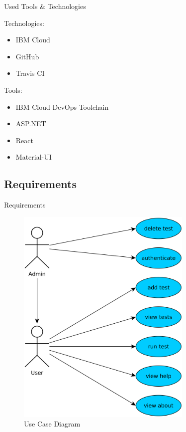 \documentclass[]{beamer}
\begin{document}
    \begin{frame}{Used Tools \& Technologies}
      \setlength{\columnsep}{-40mm}
      \begin{adjustwidth}{12.5mm}{-12.5mm}
        \begin{multicols}{2}
          Technologies:
          \begin{itemize}
            \item IBM Cloud
            \item GitHub
            \item Travis CI
          \end{itemize}

          \columnbreak

          Tools:
          \begin{itemize}
            \item IBM Cloud DevOps Toolchain
            \item ASP.NET
            \item React
            \item Material-UI
          \end{itemize}
        \end{multicols}
      \end{adjustwidth}
    \end{frame}

  \subsection{Requirements}

    \begin{frame}{Requirements}
      \begin{figure}[H]
        \includegraphics[width=0.75\textwidth,height=0.75\textheight,keepaspectratio]{diag/use_case.pdf}
        \caption{Use Case Diagram}
      \end{figure}
    \end{frame}
\end{document}
